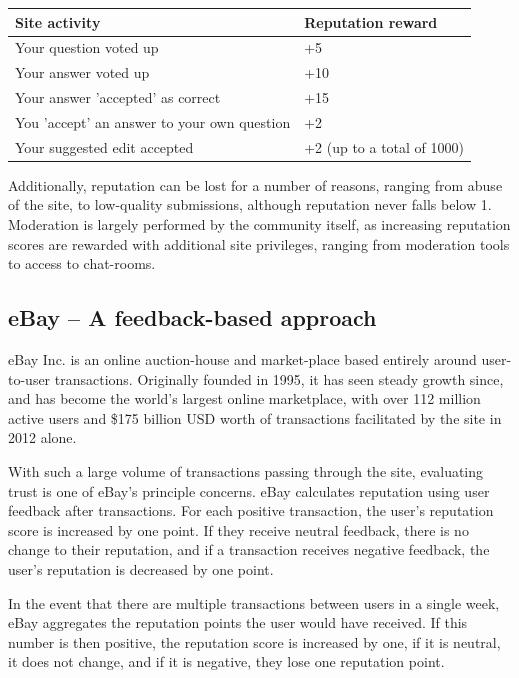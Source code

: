 \documentclass[]{final_report}
\begin{document}
\begin{minipage}{\linewidth}
\centering
\begin{tabular}{|l|l|}
\hline \textbf{Site activity} & \textbf{Reputation reward} \\ 
\hline Your question voted up & +5 \\ 
\hline Your answer voted up & +10 \\ 
\hline Your answer 'accepted' as correct & +15 \\ 
\hline You 'accept' an answer to your own question & +2 \\ 
\hline Your suggested edit accepted & +2 (up to a total of 1000) \\ 
\hline 
\end{tabular}\par
{} \label{tab:title}
\end{minipage}


Additionally, reputation can be lost for a number of reasons, ranging from abuse of the site, to low-quality submissions, although reputation never falls below 1. Moderation is largely performed by the community itself, as increasing reputation scores are rewarded with additional site privileges, ranging from moderation tools to access to chat-rooms.


\subsection{eBay -- A feedback-based approach}

eBay Inc. is an online auction-house and market-place based entirely around user-to-user transactions. Originally founded in 1995, it has seen steady growth since, and has become the world's largest online marketplace, with over 112 million active users and \$175 billion USD worth of transactions facilitated by the site in 2012 alone.

With such a large volume of transactions passing through the site, evaluating trust is one of eBay's principle concerns. eBay calculates reputation using user feedback after transactions. For each positive transaction, the user's reputation score is increased by one point. If they receive neutral feedback, there is no change to their reputation, and if a transaction receives negative feedback, the user's reputation is decreased by one point.

In the event that there are multiple transactions between users in a single week, eBay aggregates the reputation points the user would have received. If this number is then positive, the reputation score is increased by one, if it is neutral, it does not change, and if it is negative, they lose one reputation point.
\end{document}
